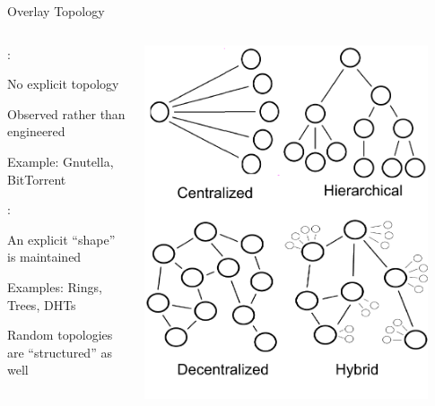 \begin{frame}{Overlay Topology}

\begin{columns}
\begin{column}{0.4\textwidth}
:
	\BI
	\item No explicit topology
	\item Observed rather than engineered
	\item Example: Gnutella, BitTorrent
	\EI
	
\bigskip
{}:
\BI
\item An explicit “shape” is maintained
\item Examples: Rings, Trees, DHTs
\item Random topologies are “structured” as well
\EI
\end{column}
\begin{column}{0.6\textwidth}
	\includegraphics[width=0.9\textwidth]{figs/10/p2ptypes}
\end{column}
\end{columns}

\end{frame}


